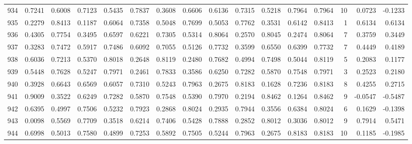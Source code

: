 \begin{tabular}{lrrrrrrrrrrrrrrr}
934 &      0.7241 &  0.6008 &  0.7123 &  0.5435 &  0.7837 &  0.3608 &  0.6606 &  0.6136 &  0.7315 &  0.5218 &   0.7964 &     0.7964 &     10 &                    0.0723 &                    -0.1233 \\
935 &      0.2279 &  0.8413 &  0.1187 &  0.6064 &  0.7358 &  0.5048 &  0.7699 &  0.5053 &  0.7762 &  0.3531 &   0.6142 &     0.8413 &      1 &                    0.6134 &                     0.6134 \\
936 &      0.4305 &  0.7754 &  0.3495 &  0.6597 &  0.6221 &  0.7305 &  0.5314 &  0.8064 &  0.2570 &  0.8045 &   0.2474 &     0.8064 &      7 &                    0.3759 &                     0.3449 \\
937 &      0.3283 &  0.7472 &  0.5917 &  0.7486 &  0.6092 &  0.7055 &  0.5126 &  0.7732 &  0.3599 &  0.6550 &   0.6399 &     0.7732 &      7 &                    0.4449 &                     0.4189 \\
938 &      0.6036 &  0.7213 &  0.5370 &  0.8018 &  0.2648 &  0.8119 &  0.2480 &  0.7682 &  0.4994 &  0.7498 &   0.5044 &     0.8119 &      5 &                    0.2083 &                     0.1177 \\
939 &      0.5448 &  0.7628 &  0.5247 &  0.7971 &  0.2461 &  0.7833 &  0.3586 &  0.6250 &  0.7282 &  0.5870 &   0.7548 &     0.7971 &      3 &                    0.2523 &                     0.2180 \\
940 &      0.3928 &  0.6643 &  0.6569 &  0.6057 &  0.7310 &  0.5243 &  0.7963 &  0.2675 &  0.8183 &  0.1628 &   0.7236 &     0.8183 &      8 &                    0.4255 &                     0.2715 \\
941 &      0.9009 &  0.3522 &  0.6249 &  0.7282 &  0.5870 &  0.7548 &  0.5390 &  0.7970 &  0.2194 &  0.8462 &   0.1264 &     0.8462 &      9 &                   -0.0547 &                    -0.5487 \\
942 &      0.6395 &  0.4997 &  0.7506 &  0.5232 &  0.7923 &  0.2868 &  0.8024 &  0.2935 &  0.7944 &  0.3556 &   0.6384 &     0.8024 &      6 &                    0.1629 &                    -0.1398 \\
943 &      0.0098 &  0.5569 &  0.7709 &  0.3518 &  0.6214 &  0.7406 &  0.5428 &  0.7888 &  0.2852 &  0.8012 &   0.3036 &     0.8012 &      9 &                    0.7914 &                     0.5471 \\
944 &      0.6998 &  0.5013 &  0.7580 &  0.4899 &  0.7253 &  0.5892 &  0.7505 &  0.5244 &  0.7963 &  0.2675 &   0.8183 &     0.8183 &     10 &                    0.1185 &                    -0.1985 \\

\end{tabular}
